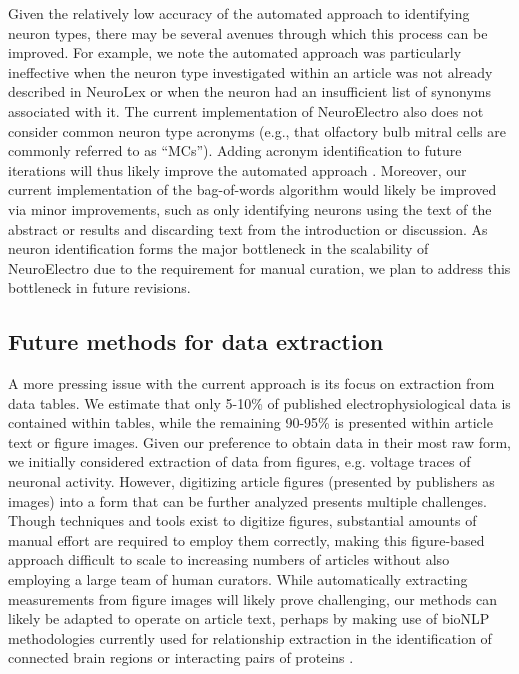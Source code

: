 \documentclass{template/frontiersSCNS} %
\begin{document}
Given the relatively low accuracy of the automated approach to identifying neuron types, there may be several avenues through which this process can be improved. 
For example, we note the automated approach was particularly ineffective when the neuron type investigated within an article was not already described in NeuroLex or when the neuron had an insufficient list of synonyms associated with it.  
The current implementation of NeuroElectro also does not consider common neuron type acronyms (e.g., that olfactory bulb mitral cells are commonly referred to as ``MCs'').  
Adding acronym identification to future iterations will thus likely improve the automated approach \citep{okazaki_building_2006,french_using_2012}.  
Moreover, our current implementation of the bag-of-words algorithm would likely be improved via minor improvements, such as only identifying neurons using the text of the abstract or results and discarding text from the introduction or discussion. 
As neuron identification forms the major bottleneck in the scalability of NeuroElectro due to the requirement for manual curation, we plan to address this bottleneck in future revisions.  

\subsection{Future methods for data extraction}
A more pressing issue with the current approach is its focus on extraction from data tables.  
We estimate that only 5-10\% of published electrophysiological data is contained within tables, while the remaining 90-95\% is presented within article text or figure images.  
Given our preference to obtain data in their most raw form, we initially considered extraction of data from figures, e.g. voltage traces of neuronal activity.  
However, digitizing article figures (presented by publishers as images) into a form that can be further analyzed presents multiple challenges.  
Though techniques and tools exist to digitize figures, substantial amounts of manual effort are required to employ them correctly, making this figure-based approach difficult to scale to increasing numbers of articles without also employing a large team of human curators.  
While automatically extracting measurements from figure images will likely prove challenging, our methods can likely be adapted to operate on article text, perhaps by making use of bioNLP methodologies currently used for relationship extraction in the identification of connected brain regions \citep{french_application_2012} or interacting pairs of proteins \citep{kim_classifying_2011}. 
\end{document}
